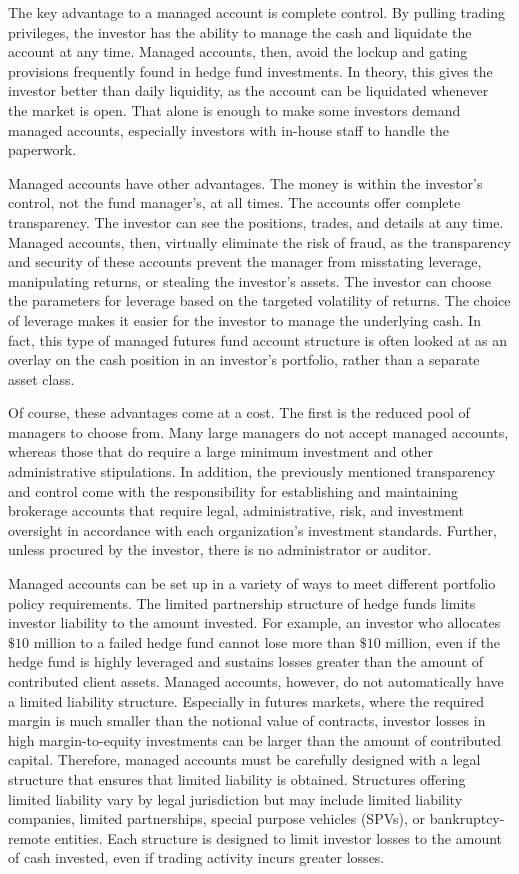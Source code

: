 \documentclass[11pt]{article}
\begin{document}
The key advantage to a managed account is complete control. By pulling trading privileges, the investor has the ability to manage the cash and liquidate the account at any time. Managed accounts, then, avoid the lockup and gating provisions frequently found in hedge fund investments. In theory, this gives the investor better than daily liquidity, as the account can be liquidated whenever the market is open. That alone is enough to make some investors demand managed accounts, especially investors with in-house staff to handle the paperwork.

Managed accounts have other advantages. The money is within the investor's control, not the fund manager's, at all times. The accounts offer complete transparency. The investor can see the positions, trades, and details at any time. Managed accounts, then, virtually eliminate the risk of fraud, as the transparency and security of these accounts prevent the manager from misstating leverage, manipulating returns, or stealing the investor's assets. The investor can choose the parameters for leverage based on the targeted volatility of returns. The choice of leverage makes it easier for the investor to manage the underlying cash. In fact, this type of managed futures fund account structure is often looked at as an overlay on the cash position in an investor's portfolio, rather than a separate asset class.

Of course, these advantages come at a cost. The first is the reduced pool of managers to choose from. Many large managers do not accept managed accounts, whereas those that do require a large minimum investment and other administrative stipulations. In addition, the previously mentioned transparency and control come with the responsibility for establishing and maintaining brokerage accounts that require legal, administrative, risk, and investment oversight in accordance with each organization's investment standards. Further, unless procured by the investor, there is no administrator or auditor.

Managed accounts can be set up in a variety of ways to meet different portfolio policy requirements. The limited partnership structure of hedge funds limits investor liability to the amount invested. For example, an investor who allocates $\$ 10$ million to a failed hedge fund cannot lose more than $\$ 10$ million, even if the hedge fund is highly leveraged and sustains losses greater than the amount of contributed client assets. Managed accounts, however, do not automatically have a limited liability structure. Especially in futures markets, where the required margin is much smaller than the notional value of contracts, investor losses in high margin-to-equity investments can be larger than the amount of contributed capital. Therefore, managed accounts must be carefully designed with a legal structure that ensures that limited liability is obtained. Structures offering limited liability vary by legal jurisdiction but may include limited liability companies, limited partnerships, special purpose vehicles (SPVs), or bankruptcy-remote entities. Each structure is designed to limit investor losses to the amount of cash invested, even if trading activity incurs greater losses.
\end{document}
